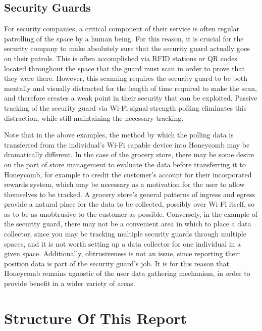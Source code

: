\subsection{Security Guards}

For security companies, a critical component of their service is often regular patrolling of the space by a human being. For this reason, it is crucial for the security company to make absolutely sure that the security guard actually goes on their patrols. This is often accomplished via RFID stations or QR codes located throughout the space that the guard must scan in order to prove that they were there. However, this scanning requires the security guard to be both mentally and visually distracted for the length of time required to make the scan, and therefore creates a weak point in their security that can be exploited. Passive tracking of the security guard via Wi-Fi signal strength polling eliminates this distraction, while still maintaining the necessary tracking. 

Note that in the above examples, the method by which the polling data is transferred from the individual's Wi-Fi capable device into Honeycomb may be dramatically different. In the case of the grocery store, there may be some desire on the part of store management to evaluate the data before transferring it to Honeycomb, for example to credit the customer's account for their incorporated rewards system, which may be necessary as a motivation for the user to allow themselves to be tracked. A grocery store's general patterns of ingress and egress provide a natural place for the data to be collected, possibly over Wi-Fi itself, so as to be as unobtrusive to the customer as possible. Conversely, in the example of the security guard, there may not be a convenient area in which to place a data collector, since you may be tracking multiple security guards through multiple spaces, and it is not worth setting up a data collector for one individual in a given space. Additionally, obtrusiveness is not an issue, since reporting their position data is part of the security guard's  job. It is for this reason that Honeycomb remains agnostic of the user data gathering mechanism, in order to provide benefit in a wider variety of areas.


\section{Structure Of This Report}
%

